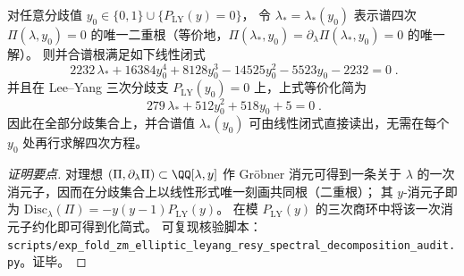 \begin{conclusion}\label{con:xi-terminal-zm-branch-double-root-linear-closure}
对任意分歧值
\(
y_0\in\{0,1\}\cup\{P_{\mathrm{LY}}(y)=0\}
\)，
令 \(\lambda_*=\lambda_*(y_0)\) 表示谱四次 \(\Pi(\lambda,y_0)=0\) 的唯一二重根（等价地，\(\Pi(\lambda_*,y_0)=\partial_{\lambda}\Pi(\lambda_*,y_0)=0\) 的唯一解）。
则并合谱根满足如下线性闭式
\[
\boxed{\;
2232\,\lambda_*+16384y_0^{4}+8128y_0^{3}-14525y_0^{2}-5523y_0-2232=0\; }.
\]
并且在 Lee--Yang 三次分歧支 \(P_{\mathrm{LY}}(y_0)=0\) 上，上式等价化简为
\[
\boxed{\;
279\,\lambda_*+512y_0^{2}+518y_0+5=0\; }.
\]
因此在全部分歧集合上，并合谱值 \(\lambda_*(y_0)\) 可由线性闭式直接读出，无需在每个 \(y_0\) 处再行求解四次方程。
\end{conclusion}
\begin{proof}[证明要点]
对理想 \((\Pi,\partial_{\lambda}\Pi)\subset\QQ[\lambda,y]\) 作 Gröbner 消元可得到一条关于 \(\lambda\) 的一次消元子，因而在分歧集合上以线性形式唯一刻画共同根（二重根）；
其 \(y\)-消元子即为 \(\mathrm{Disc}_{\lambda}(\Pi)=-y(y-1)P_{\mathrm{LY}}(y)\)。
在模 \(P_{\mathrm{LY}}(y)\) 的三次商环中将该一次消元子约化即可得到化简式。
可复现核验脚本：\texttt{scripts/exp\_fold\_zm\_elliptic\_leyang\_resy\_spectral\_decomposition\_audit.py}。证毕。
\end{proof}

